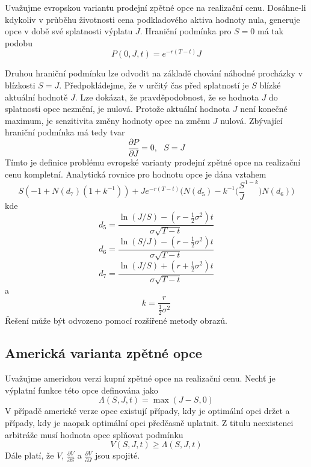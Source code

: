 \documentclass[a4paper]{book}
\begin{document}
Uvažujme evropskou variantu prodejní zpětné opce na realizační cenu. Dosáhne-li kdykoliv v průběhu životnosti cena podkladového aktiva hodnoty nula, generuje opce v době své splatnosti výplatu $J$. Hraniční podmínka pro $S = 0$ má tak podobu
\begin{equation}
P(0, J, t) = e^{-r(T - t)}J
\end{equation}

Druhou hraniční podmínku lze odvodit na základě chování náhodné procházky v blízkosti $S = J$. Předpokládejme, že v určitý čas před splatností je $S$ blízké aktuální hodnotě $J$. Lze dokázat, že pravděpodobnost, že se hodnota $J$ do splatnosti opce nezmění, je nulová. Protože aktuální hodnota $J$ není konečné maximum, je senzitivita změny hodnoty opce na změnu $J$ nulová. Zbývající hraniční podmínka má tedy tvar
\begin{equation}
\frac{\partial P}{\partial J} = 0, ~~~ S = J
\end{equation}
Tímto je definice problému evropské varianty prodejní zpětné opce na realizační cenu kompletní. Analytická rovnice pro hodnotu opce je dána vztahem
\begin{equation*}
S(-1 + N(d_7)(1 + k^{-1})) + Je^{-r(T-t)}\Big( N(d_5) - k^{-1} \Big( \frac{S}{J}^{1-k} \Big) N(d_6) \Big)
\end{equation*}
kde
\begin{equation*}
d_5 = \frac{\ln (J/S) - (r - \frac{1}{2}\sigma^2)t}{\sigma \sqrt{T - t}}
\end{equation*}
\begin{equation*}
d_6 = \frac{\ln (S/J) - (r - \frac{1}{2}\sigma^2)t}{\sigma \sqrt{T - t}}
\end{equation*}
\begin{equation*}
d_7= \frac{\ln (J/S) + (r + \frac{1}{2}\sigma^2)t}{\sigma \sqrt{T - t}}
\end{equation*}
a
\begin{equation*}
k = \frac{r}{\frac{1}{2}\sigma^2}
\end{equation*}
Řešení může být odvozeno pomocí rozšířené metody obrazů.

\subsection{Americká varianta zpětné opce}

Uvažujme americkou verzi kupní zpětné opce na realizační cenu. Nechť je výplatní funkce této opce definována jako
\begin{equation*}
\Lambda(S, J, t) = \max(J - S, 0)
\end{equation*}
V případě americké verze opce existují případy, kdy je optimální opci držet a případy, kdy je naopak optimální opci předčasně uplatnit. Z titulu neexistenci arbitráže musí hodnota opce splňovat podmínku
\begin{equation}
V(S, J, t) \ge \Lambda(S, J, t)
\end{equation}
Dále platí, že $V$, $\frac{\partial V}{\partial S}$ a $\frac{\partial V}{\partial J}$ jsou spojité.
\end{document}
